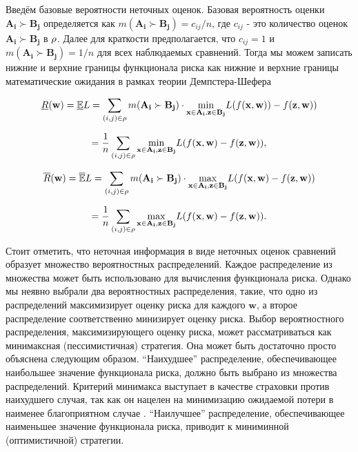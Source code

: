 \documentclass[12pt,a4paper,oneside]{article}
\begin{document}
\par
Введём базовые вероятности неточных оценок. 
Базовая вероятность оценки \(\mathbf{A_i} \succ \mathbf{B_j}\) определяется как \(m(\mathbf{A_i} \succ \mathbf{B_j}) = c_{ij} / n\), где \(c_{ij}\) - это количество оценок \(\mathbf{A_i} \succ \mathbf{B_j}\) в \(\mathrm{\rho}\). 
Далее для краткости предполагается, что \(c_{ij} = 1\) и \(m(\mathbf{A_i} \succ \mathbf{B_j}) = 1/n\) для всех наблюдаемых сравнений. 
Тогда мы можем записать нижние и верхние границы функционала риска как нижние и верхние границы математические ожидания в рамках теории Демпстера-Шефера

\[
\underline{R}(\mathbf{w}) = \mathbb{\underline{E}}L = \sum \limits_{(i,j) \in \Rho} m(\mathbf{A_i} \succ \mathbf{B_j}) \cdot \underset{%
	\mathbf{x} \in \mathbf{A_i}, \mathbf{z} \in \mathbf{B_j}%
}{\operatorname{min}} %
L(f(\mathbf{x}, \mathbf{w})) - f(\mathbf{z}, \mathbf{w}))
\]

\[
= \frac{1}{n} \sum \limits_{(i,j) \in \Rho} \underset{%
\mathbf{x} \in \mathbf{A_i}, \mathbf{z} \in \mathbf{B_j}%
}{\operatorname{min}}%
L(f(\mathbf{x}, \mathbf{w}) - f(\mathbf{z}, \mathbf{w})),
\]

\[
\overline{R}(\mathbf{w}) = \mathbb{\overline{E}} L = \sum \limits_{(i,j) \in \Rho} m(\mathbf{A_i} \succ \mathbf{B_j}) \cdot \underset{%
	\mathbf{x} \in \mathbf{A_i}, \mathbf{z} \in \mathbf{B_j}%
}{\operatorname{max}}
L (f (\mathbf{x}, \mathbf{w}) - f(\mathbf{z}, \mathbf{w}))
\]

\[
= \frac{1}{n} \sum \limits_{(i,j) \in \Rho} \underset{%
	\mathbf{x} \in \mathbf{A_i}, \mathbf{z} \in \mathbf{B_j}%
}{\operatorname{max}}%
L (f(\mathbf{x}, \mathbf{w}) - f(\mathbf{z}, \mathbf{w})).
\]

\par
Стоит отметить, что неточная информация в виде неточных оценок сравнений образует множество вероятностных распределений. 
Каждое распределение из множества может быть использовано для вычисления функционала риска.
Однако мы неявно выбрали два вероятностных распределения, такие, что одно из распределений максимизирует оценку риска для каждого \(\mathbf{w}\), а второе распределение соответственно минизирует оценку риска. 
Выбор вероятностного распределения, максимизирующего оценку риска, может рассматриваться как минимаксная (пессимистичная) стратегия. 
Она может быть достаточно просто объяснена следующим образом. 
``Наихудшее'' распределение, обеспечивающее наибольшее значение функционала риска, должно быть выбрано из множества распределений. 
Критерий минимакса выступает в качестве страховки против наихудшего случая, так как он нацелен на минимизацию ожидаемой потери в наименее благоприятном случае . 
``Наилучшее'' распределение, обеспечивающее наименьшее значение функционала риска, приводит к миниминной (оптимистичной) стратегии.
\end{document}
